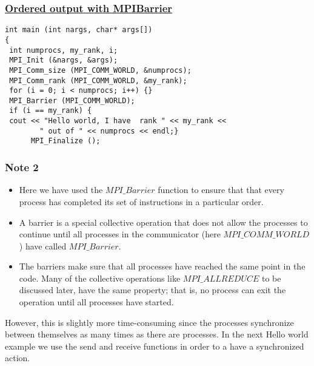 \documentclass{beamer}
\begin{document}
\begin{frame}
\frametitle{\href{{https://github.com/CompPhysics/ComputationalPhysics2/blob/gh-pages/doc/Programs/LecturePrograms/programs/MPI/chapter07/program3.cpp}}{Ordered output with MPIBarrier}}

\begin{block}{}

\begin{verbatim}
int main (int nargs, char* args[])
{
 int numprocs, my_rank, i;
 MPI_Init (&nargs, &args);
 MPI_Comm_size (MPI_COMM_WORLD, &numprocs);
 MPI_Comm_rank (MPI_COMM_WORLD, &my_rank);
 for (i = 0; i < numprocs; i++) {}
 MPI_Barrier (MPI_COMM_WORLD);
 if (i == my_rank) {
 cout << "Hello world, I have  rank " << my_rank << 
        " out of " << numprocs << endl;}
      MPI_Finalize ();
\end{verbatim}

\end{block}
\end{frame}

\begin{frame}
\frametitle{Note 2}

\begin{block}{}
\begin{itemize}
\item Here we have used the $MPI\_Barrier$ function to ensure that that every process has completed  its set of instructions in  a particular order.

\item A barrier is a special collective operation that does not allow the processes to continue until all processes in the communicator (here $MPI\_COMM\_WORLD$) have called $MPI\_Barrier$. 

\item The barriers make sure that all processes have reached the same point in the code. Many of the collective operations like $MPI\_ALLREDUCE$ to be discussed later, have the same property; that is, no process can exit the operation until all processes have started. 
\end{itemize}

\noindent
However, this is slightly more time-consuming since the processes synchronize between themselves as many times as there
are processes.  In the next Hello world example we use the send and receive functions in order to a have a synchronized
action.


\end{block}
\end{frame}
\end{document}
